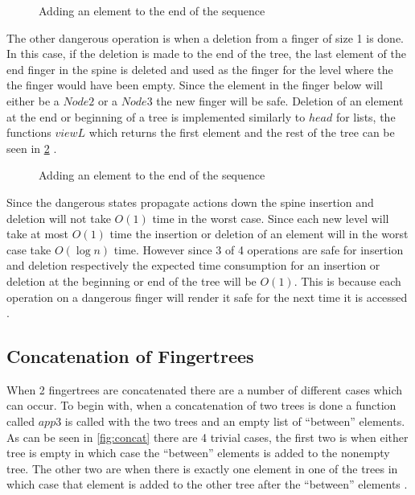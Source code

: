 \begin{figure}[h!]

\caption{Adding an element to the end of the sequence \label{fig:AddLast}\cite{fingertree}}
\end{figure}

The other dangerous operation is when a deletion from a finger of size 1 is
done. In this case, if the deletion is made to the end of the tree, the last
element of the end finger in the spine is deleted and used as the finger for the
level where the the finger would have been empty. Since the element in the
finger below will either be a $Node2$ or a $Node3$ the new finger will be safe.
Deletion of an element at the end or beginning of a tree is implemented
similarly to $head$ for lists, the functions $viewL$ which returns the first
element and the rest of the tree can be seen in \cref{fig:Viewl} \cite{fingertree}.

\begin{figure}[h!]

\caption{Adding an element to the end of the sequence \label{fig:Viewl} \cite{fingertree}}
\end{figure}

Since the dangerous states propagate actions down the spine insertion and
deletion will not take $O(1)$ time in the worst case. Since
each new level will take at most $O(1)$ time the insertion or deletion of an
element will in the worst case take $O(\log n)$ time. However since 3 of 4
operations are safe for insertion and deletion respectively the expected time
consumption for an insertion or deletion at the beginning or end of the tree will
be $O(1)$. This is because each operation on a dangerous finger will render it
safe for the next time it is accessed \cite{fingertree}.

\subsection{Concatenation of Fingertrees}
When 2 fingertrees are concatenated there are a number of different cases which
can occur. To begin with, when a concatenation of two trees is done a function
called $app3$ is called with the two trees and an empty list of ``between''
elements. As can be seen in \cref{fig:concat} there are 4 trivial cases, the first
two is when either tree is empty in which case the ``between'' elements is
added to the nonempty tree. The other two are when there is exactly one element
in one of the trees in which case that element is added to the other tree after
the ``between'' elements \cite{fingertree}.

